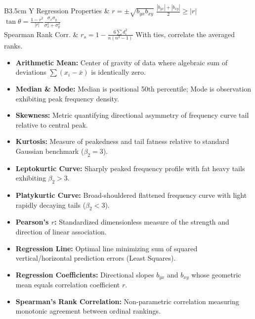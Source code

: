 \documentclass[12pt,a4paper]{article}
\begin{document}
\begin{tcolorbox}[formulabox, title={\textbf{Key Formulas and Statistical Identities at a Glance}}]
\begin{tabularx}{\linewidth}{B{3.5cm} Y}
Regression Properties & $r = \pm\sqrt{b_{yx} b_{xy}}$ \newline $\frac{|b_{yx}|+|b_{xy}|}{2} \ge |r|$ \newline $\tan\theta = \frac{1-r^2}{|r|}\frac{\sigma_x \sigma_y}{\sigma_x^2+\sigma_y^2}$ \\[3pt]
Spearman Rank Corr. & $r_s = 1 - \frac{6\sum d_i^2}{n(n^2-1)}$ \newline With ties, correlate the averaged ranks. \\[3pt]
\end{tabularx}\par
\end{tcolorbox}

\vspace{1pt}

\begin{tcolorbox}[defbox, title={\textbf{One-Line Definitions}}]
\begin{itemize}[leftmargin=*, itemsep=2pt, topsep=0pt, parsep=0pt]
  \item \textbf{Arithmetic Mean:} Center of gravity of data where algebraic sum of deviations $\sum(x_i - \bar{x})$ is identically zero.
  \item \textbf{Median \& Mode:} Median is positional 50th percentile; Mode is observation exhibiting peak frequency density.
  \item \textbf{Skewness:} Metric quantifying directional asymmetry of frequency curve tail relative to central peak.
  \item \textbf{Kurtosis:} Measure of peakedness and tail fatness relative to standard Gaussian benchmark ($\beta_2 = 3$).
  \item \textbf{Leptokurtic Curve:} Sharply peaked frequency profile with fat heavy tails exhibiting $\beta_2 > 3$.
  \item \textbf{Platykurtic Curve:} Broad-shouldered flattened frequency curve with light rapidly decaying tails ($\beta_2 < 3$).
  \item \textbf{Pearson's $r$:} Standardized dimensionless measure of the strength and direction of linear association.
  \item \textbf{Regression Line:} Optimal line minimizing sum of squared vertical/horizontal prediction errors (Least Squares).
  \item \textbf{Regression Coefficients:} Directional slopes $b_{yx}$ and $b_{xy}$ whose geometric mean equals correlation coefficient $r$.
  \item \textbf{Spearman's Rank Correlation:} Non-parametric correlation measuring monotonic agreement between ordinal rankings.
\end{itemize}
\end{tcolorbox}
\end{document}
